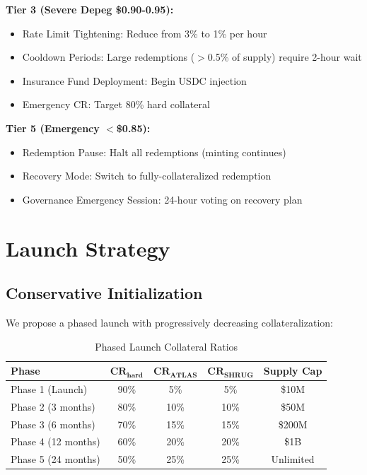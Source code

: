 \documentclass[11pt,a4paper]{article}
\begin{document}
\textbf{Tier 3 (Severe Depeg \$0.90-0.95):}
\begin{itemize}
    \item Rate Limit Tightening: Reduce from 3\% to 1\% per hour
    \item Cooldown Periods: Large redemptions ($>$0.5\% of supply) require 2-hour wait
    \item Insurance Fund Deployment: Begin USDC injection
    \item Emergency CR: Target 80\% hard collateral
\end{itemize}

\textbf{Tier 5 (Emergency $<$\$0.85):}
\begin{itemize}
    \item Redemption Pause: Halt all redemptions (minting continues)
    \item Recovery Mode: Switch to fully-collateralized redemption
    \item Governance Emergency Session: 24-hour voting on recovery plan
\end{itemize}

\section{Launch Strategy}
\label{sec:launch}

\subsection{Conservative Initialization}

We propose a phased launch with progressively decreasing collateralization:

\begin{table}[H]
\centering
\caption{Phased Launch Collateral Ratios}
\begin{tabular}{@{}lcccc@{}}
\toprule
\textbf{Phase} & $\textbf{CR}_{\textbf{hard}}$ & $\textbf{CR}_{\textbf{ATLAS}}$ & $\textbf{CR}_{\textbf{SHRUG}}$ & \textbf{Supply Cap} \\ \midrule
Phase 1 (Launch) & 90\% & 5\% & 5\% & \$10M \\
Phase 2 (3 months) & 80\% & 10\% & 10\% & \$50M \\
Phase 3 (6 months) & 70\% & 15\% & 15\% & \$200M \\
Phase 4 (12 months) & 60\% & 20\% & 20\% & \$1B \\
Phase 5 (24 months) & 50\% & 25\% & 25\% & Unlimited \\ \bottomrule
\end{tabular}
\end{table}
\end{document}
